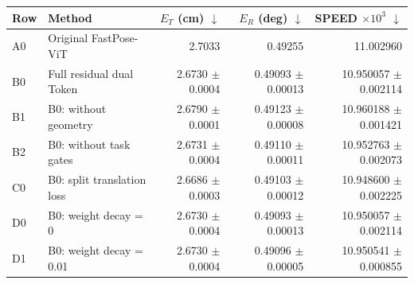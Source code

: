 \begin{tabular}{llrrr}
\toprule
Row & Method & $E_T$ (cm) $\downarrow$ & $E_R$ (deg) $\downarrow$ & SPEED $\times 10^3$ $\downarrow$ \\
\midrule
A0 & Original FastPose-ViT & 2.7033 & 0.49255 & 11.002960 \\
B0 & Full residual dual Token & 2.6730 $\pm$ 0.0004 & 0.49093 $\pm$ 0.00013 & 10.950057 $\pm$ 0.002114 \\
B1 & B0: without geometry & 2.6790 $\pm$ 0.0001 & 0.49123 $\pm$ 0.00008 & 10.960188 $\pm$ 0.001421 \\
B2 & B0: without task gates & 2.6731 $\pm$ 0.0004 & 0.49110 $\pm$ 0.00011 & 10.952763 $\pm$ 0.002073 \\
C0 & B0: split translation loss & 2.6686 $\pm$ 0.0003 & 0.49103 $\pm$ 0.00012 & 10.948600 $\pm$ 0.002225 \\
D0 & B0: weight decay = 0 & 2.6730 $\pm$ 0.0004 & 0.49093 $\pm$ 0.00013 & 10.950057 $\pm$ 0.002114 \\
D1 & B0: weight decay = 0.01 & 2.6730 $\pm$ 0.0004 & 0.49096 $\pm$ 0.00005 & 10.950541 $\pm$ 0.000855 \\
\bottomrule
\end{tabular}
